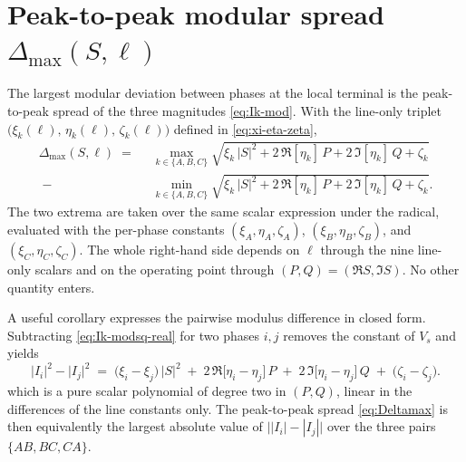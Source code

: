 
\section{\texorpdfstring{Peak-to-peak modular spread $\Delta_{\max}(S,\ell)$}{Peak-to-peak modular spread Delta_max(S, ell)}}
\label{sec:spread}

The largest modular deviation between phases at the local terminal is
the peak-to-peak spread of the three magnitudes
\autoref{eq:Ik-mod}. With the line-only triplet
$\bigl(\xi_{k}(\ell),\,\eta_{k}(\ell),\,\zeta_{k}(\ell)\bigr)$ defined in
\autoref{eq:xi-eta-zeta},
%
\begin{equation}
\label{eq:Deltamax}
\boxed{\;
\begin{aligned}
\Delta_{\max}(S,\ell)
\;=\;\;& \max_{k\in\{A,B,C\}}
   \sqrt{\xi_{k}\,|S|^{2} + 2\,\Re[\eta_{k}]\,P + 2\,\Im[\eta_{k}]\,Q + \zeta_{k}} \\[2pt]
{}\;-\;& \min_{k\in\{A,B,C\}}
   \sqrt{\xi_{k}\,|S|^{2} + 2\,\Re[\eta_{k}]\,P + 2\,\Im[\eta_{k}]\,Q + \zeta_{k}}.
\end{aligned}
\;}
\end{equation}
%
\noindent The two extrema are taken over the same scalar expression
under the radical, evaluated with the per-phase constants
$(\xi_{A},\eta_{A},\zeta_{A})$, $(\xi_{B},\eta_{B},\zeta_{B})$, and
$(\xi_{C},\eta_{C},\zeta_{C})$. The whole right-hand side depends on
$\ell$ through the nine line-only scalars and on the operating point
through $(P,Q) = (\Re S,\Im S)$. No other quantity enters.

A useful corollary expresses the pairwise modulus difference in closed
form. Subtracting \autoref{eq:Ik-modsq-real} for two phases $i,j$
removes the constant of $V_{s}$ and yields
%
\begin{equation}
\label{eq:pairwise}
\bigl|I_{i}\bigr|^{2}
-
\bigl|I_{j}\bigr|^{2}
\;=\;
\bigl(\xi_{i}-\xi_{j}\bigr)\,|S|^{2}
\;+\;
2\,\Re\!\bigl[\eta_{i}-\eta_{j}\bigr]\,P
\;+\;
2\,\Im\!\bigl[\eta_{i}-\eta_{j}\bigr]\,Q
\;+\;
\bigl(\zeta_{i}-\zeta_{j}\bigr).
\end{equation}
%
\noindent which is a pure scalar polynomial of degree two in $(P,Q)$,
linear in the differences of the line constants only. The
peak-to-peak spread \autoref{eq:Deltamax} is then equivalently the
largest absolute value of $\bigl||I_{i}|-|I_{j}|\bigr|$ over the three
pairs $\{AB, BC, CA\}$.


